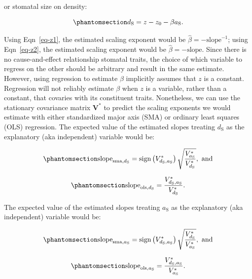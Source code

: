 \documentclass[
  letterpaper,
  DIV=11,
  numbers=noendperiod]{scrartcl}
\begin{document}
or stomatal size on density:

\begin{equation}\phantomsection\label{eq-z2}{d_\mathrm{S} = z - z_0 - \beta a_\mathrm{S}.}\end{equation}

Using Eqn~\ref{eq-z1}, the estimated scaling exponent would be
\(\hat{\beta} = -\text{slope}^{-1}\); using Eqn~\ref{eq-z2}, the
estimated scaling exponent would be \(\hat{\beta} = -\text{slope}\).
Since there is no cause-and-effect relationship stomatal traits, the
choice of which variable to regress on the other should be arbitrary and
result in the same estimate. However, using regression to estimate
\(\beta\) implicitly assumes that \(z\) is a constant. Regression will
not reliably estimate \(\beta\) when \(z\) is a variable, rather than a
constant, that covaries with its constituent traits. Nonetheless, we can
use the stationary covariance matrix \(\mathbf{V}^*\) to predict the
scaling exponents we would estimate with either standardized major axis
(SMA) or ordinary least squares (OLS) regression. The expected value of
the estimated slopes treating \(d_\mathrm{S}\) as the explanatory (aka
independent) variable would be:

\begin{equation}\phantomsection\label{eq-slope1-sma}{\text{slope}_{\text{sma},d_\mathrm{S}} = \text{sign} \left( V^*_{d_\mathrm{S},a_\mathrm{S}} \right) \sqrt{\frac{V^*_{a_\mathrm{S}}}{V^*_{d_\mathrm{S}}}},~\text{and}}\end{equation}

\begin{equation}\phantomsection\label{eq-slope1-ols}{\text{slope}_{\text{ols},d_\mathrm{S}} = \frac{V^*_{d_\mathrm{S},a_\mathrm{S}}}{V^*_{d_\mathrm{S}}}.}\end{equation}

The expected value of the estimated slopes treating \(a_\mathrm{S}\) as
the explanatory (aka independent) variable would be:

\begin{equation}\phantomsection\label{eq-slope2-sma}{\text{slope}_{\text{sma},a_\mathrm{S}} = \text{sign} \left( V^*_{d_\mathrm{S},a_\mathrm{S}} \right) \sqrt{\frac{V^*_{d_\mathrm{S}}}{V^*_{a_\mathrm{S}}}},~\text{and}}\end{equation}

\begin{equation}\phantomsection\label{eq-slope2-ols}{\text{slope}_{\text{ols},a_\mathrm{S}} = \frac{V^*_{d_\mathrm{S},a_\mathrm{S}}}{V^*_{a_\mathrm{S}}}.}\end{equation}
\end{document}
